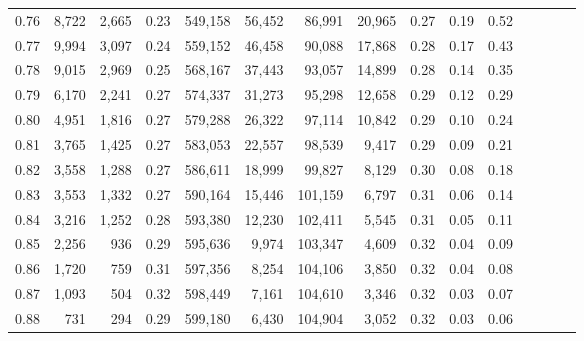 \begin{tabular}{rrrcrrrrrrrrrrr}
0.76 &   8,722 &  2,665 &                                       0.23 &  549,158 &   56,452 &   86,991 &   20,965 &  0.27 &  0.19 &                         0.52 \\
0.77 &   9,994 &  3,097 &                                       0.24 &  559,152 &   46,458 &   90,088 &   17,868 &  0.28 &  0.17 &                         0.43 \\
0.78 &   9,015 &  2,969 &                                       0.25 &  568,167 &   37,443 &   93,057 &   14,899 &  0.28 &  0.14 &                         0.35 \\
0.79 &   6,170 &  2,241 &                                       0.27 &  574,337 &   31,273 &   95,298 &   12,658 &  0.29 &  0.12 &                         0.29 \\
0.80 &   4,951 &  1,816 &                                       0.27 &  579,288 &   26,322 &   97,114 &   10,842 &  0.29 &  0.10 &                         0.24 \\
0.81 &   3,765 &  1,425 &                                       0.27 &  583,053 &   22,557 &   98,539 &    9,417 &  0.29 &  0.09 &                         0.21 \\
0.82 &   3,558 &  1,288 &                                       0.27 &  586,611 &   18,999 &   99,827 &    8,129 &  0.30 &  0.08 &                         0.18 \\
0.83 &   3,553 &  1,332 &                                       0.27 &  590,164 &   15,446 &  101,159 &    6,797 &  0.31 &  0.06 &                         0.14 \\
0.84 &   3,216 &  1,252 &                                       0.28 &  593,380 &   12,230 &  102,411 &    5,545 &  0.31 &  0.05 &                         0.11 \\
0.85 &   2,256 &    936 &                                       0.29 &  595,636 &    9,974 &  103,347 &    4,609 &  0.32 &  0.04 &                         0.09 \\
0.86 &   1,720 &    759 &                                       0.31 &  597,356 &    8,254 &  104,106 &    3,850 &  0.32 &  0.04 &                         0.08 \\
0.87 &   1,093 &    504 &                                       0.32 &  598,449 &    7,161 &  104,610 &    3,346 &  0.32 &  0.03 &                         0.07 \\
0.88 &     731 &    294 &                                       0.29 &  599,180 &    6,430 &  104,904 &    3,052 &  0.32 &  0.03 &                         0.06 \\

\end{tabular}
